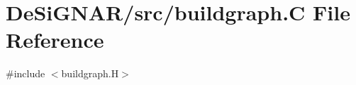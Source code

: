 \hypertarget{buildgraph_8_c}{}\section{De\+Si\+G\+N\+A\+R/src/buildgraph.C File Reference}
\label{buildgraph_8_c}
{\ttfamily \#include $<$buildgraph.\+H$>$}\newline
